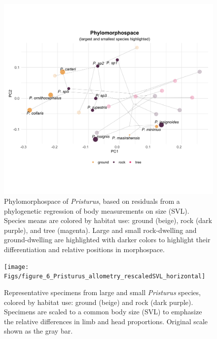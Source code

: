 \documentclass[
  11pt,
]{article}
\begin{document}
\begin{figure}

{\centering \includegraphics[width=1\linewidth]{Figs/figure_5_phylomorphospace_large_small} 

}

\caption{Phylomorphospace of \textit{Pristurus}, based on residuals from a phylogenetic regression of body measurements on size (SVL). Species means are colored by habitat use: ground (beige), rock (dark purple), and tree (magenta). Large and small rock-dwelling and ground-dwelling are highlighted with darker colors to highlight their differentiation and relative positions in morphospace.}\label{fig:unnamed-chunk-8}
\end{figure}

\newpage

\begin{figure}

{\centering \texttt{[image: Figs/figure\_6\_Pristurus\_allometry\_rescaledSVL\_horizontal]} 

}

\caption{Representative specimens from large and small \textit{Pristurus} species, colored by habitat use: ground (beige) and rock (dark purple). Specimens are scaled to a common body size (SVL) to emphasize the relative differences in limb and head proportions. Original scale shown as the gray bar.}\label{fig:unnamed-chunk-9}
\end{figure}
\end{document}

